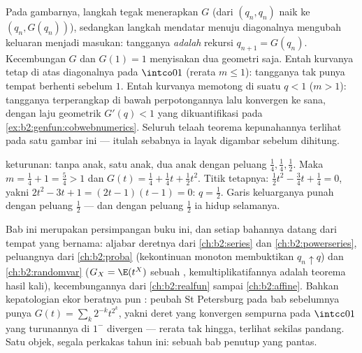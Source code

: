 \begin{remark}
Pada gambarnya, langkah tegak menerapkan $G$ (dari $(q_n, q_n)$
naik ke $(q_n, G(q_n))$), sedangkan langkah mendatar menuju diagonalnya
mengubah keluaran menjadi masukan: tangganya \emph{adalah}
rekursi $q_{n+1} = G(q_n)$. Kecembungan $G$ dan $G(1) = 1$
menyisakan dua geometri saja. Entah kurvanya tetap di atas
diagonalnya pada $\intco01$ (rerata $m \leq 1$): tangganya tak punya
tempat berhenti sebelum $1$. Entah kurvanya memotong di suatu $q <
1$ ($m > 1$): tangganya terperangkap di bawah perpotongannya
lalu konvergen ke sana, dengan laju geometrik $G'(q) < 1$
yang dikuantifikasi pada \cref{ex:b2:genfun:cobwebnumerics}. Seluruh
telaah teorema kepunahannya terlihat pada satu
gambar ini --- itulah sebabnya ia layak digambar sebelum
dihitung.
\end{remark}

\begin{example}\label{ex:b2:genfun:branchingexample}
 keturunan: tanpa anak, satu anak, dua anak dengan
peluang $\frac14, \frac14, \frac12$. Maka $m = \frac14 + 1 =
\frac54 > 1$ dan $G(t) = \frac14 + \frac14 t + \frac12 t^2$. Titik
tetapnya: $\frac12 t^2 - \frac34 t + \frac14 = 0$, yakni $2t^2 - 3t
+ 1 = (2t - 1)(t - 1) = 0$: $q = \frac12$. Garis keluarganya punah
dengan peluang $\frac12$ --- dan dengan peluang $\frac12$
ia hidup selamanya.
\end{example}

\begin{remark}
Bab ini merupakan persimpangan buku ini, dan setiap bahannya
datang dari tempat yang bernama: aljabar deretnya dari
\cref{ch:b2:series} dan \cref{ch:b2:powerseries}, peluangnya
dari \cref{ch:b2:proba} (kekontinuan monoton membuktikan
$q_n \uparrow q$) dan \cref{ch:b2:randomvar} ($G_X =
\E(t^X)$ sebuah , kemultiplikatifannya adalah teorema
hasil kali), kecembungannya dari \cref{ch:b2:realfun} sampai
\cref{ch:b2:affine}. Bahkan kepatologian ekor beratnya pun :
peubah St Petersburg pada bab sebelumnya punya
$G(t) = \sum_k2^{-k}t^{2^k}$, yakni deret yang konvergen sempurna
pada $\intcc01$ yang turunannya di $1^-$ divergen ---
rerata tak hingga, terlihat sekilas pandang. Satu objek, segala perkakas
tahun ini: sebuah bab penutup yang pantas.
\end{remark}

